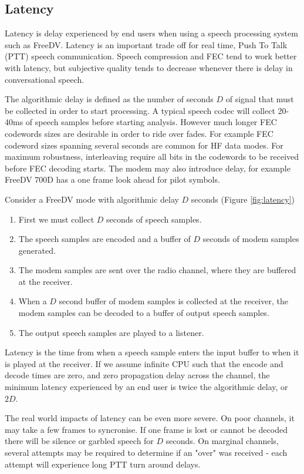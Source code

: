 \documentclass{article}
\begin{document}
\subsection{Latency}
\label{sec:latency}

Latency is delay experienced by end users when using a speech processing system such as FreeDV. Latency is an important trade off for real time, Push To Talk (PTT) speech communication. Speech compression and FEC tend to work better with latency, but subjective quality tends to decrease whenever there is delay in conversational speech.

The algorithmic delay is defined as the number of seconds $D$ of signal that must be collected in order to start processing. A typical speech codec will collect 20-40ms of speech samples before starting analysis.  However much longer FEC codewords sizes are desirable in order to ride over fades.  For example FEC codeword sizes spanning several seconds are common for HF data modes.  For maximum robustness, interleaving require all bits in the codewords to be received before FEC decoding starts.  The modem may also introduce delay, for example FreeDV 700D has a one frame look ahead for pilot symbols.

Consider a FreeDV mode with algorithmic delay $D$ seconds (Figure \ref{fig:latency})
\begin{enumerate}
\item First we must collect $D$ seconds of speech samples.
\item The speech samples are encoded and a buffer of $D$ seconds of modem samples generated.
\item The modem samples are sent over the radio channel, where they are buffered at the receiver.
\item When a $D$ second buffer of modem samples is collected at the receiver, the modem samples can be decoded to a buffer of output speech samples.
\item The output speech samples are played to a listener.
\end{enumerate}  

Latency is the time from when a speech sample enters the input buffer to when it is played at the receiver. If we assume infinite CPU such that the encode and decode times are zero, and zero propagation delay across the channel, the minimum latency experienced by an end user is twice the algorithmic delay, or $2D$.

The real world impacts of latency can be even more severe.  On poor channels, it may take a few frames to  syncronise.  If one frame is lost or cannot be decoded there will be silence or garbled speech for $D$ seconds.  On marginal channels, several attempts may be required to determine if an "over" was received - each attempt will experience long PTT turn around delays.
\end{document}
